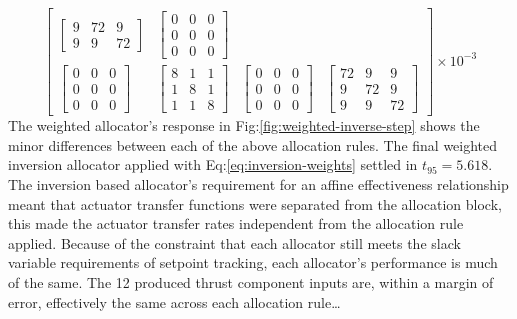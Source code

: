 \begin{equation}
\begin{bmatrix}
\begin{bmatrix}
9 & 72 & 9\\
9 & 9 & 72
\end{bmatrix}
&
\begin{bmatrix}
0 & 0 & 0\\
0 & 0 & 0\\
0 & 0 & 0
\end{bmatrix}
\\
\begin{bmatrix}
0 & 0 & 0\\
0 & 0 & 0\\
0 & 0 & 0
\end{bmatrix}
&
\begin{bmatrix}
8 & 1 & 1\\
1 & 8 & 1\\
1 & 1 & 8
\end{bmatrix}
&
\begin{bmatrix}
0 & 0 & 0\\
0 & 0 & 0\\
0 & 0 & 0
\end{bmatrix}
&
\begin{bmatrix}
72 & 9 & 9\\
9 & 72 & 9\\
9 & 9 & 72
\end{bmatrix}
\end{bmatrix}\times 10^{-3}
\end{equation}
The weighted allocator's response in Fig:\ref{fig:weighted-inverse-step} shows the minor differences between each of the above allocation rules. The final weighted inversion allocator applied with Eq:\ref{eq:inversion-weights} settled in $t_{95}=5.618$. The inversion based allocator's requirement for an affine effectiveness relationship meant that actuator transfer functions were separated from the allocation block, this made the actuator transfer rates independent from the allocation rule applied. Because of the constraint that each allocator still meets the slack variable requirements of setpoint tracking, each allocator's performance is much of the same. The 12 produced thrust component inputs are, within a margin of error, effectively the same across each allocation rule\ldots
\newpage

